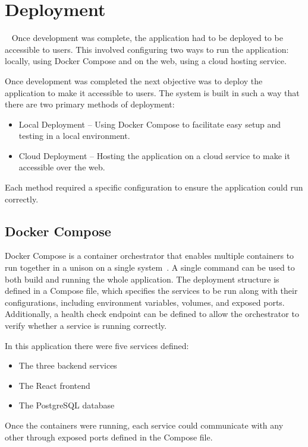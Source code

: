 \chapter{Deployment}~\label{cha:deployment}
Once development was complete, the application had to be deployed to be accessible to users. This involved configuring two ways to run the application: locally, using Docker Compose and on the web, using a cloud hosting service.

Once development was completed the next objective was to deploy the application to make it accessible to users. The system is built in such a way that there are two primary methods of deployment:

\begin{itemize}
    \item Local Deployment – Using Docker Compose to facilitate easy setup and testing in a local environment.
    \item Cloud Deployment – Hosting the application on a cloud service to make it accessible over the web.
\end{itemize}

Each method required a specific configuration to ensure the application could run correctly.

\section{Docker Compose}
Docker Compose is a container orchestrator that enables multiple containers to run together in a unison on a single system~\cite{DockerCompose}. A single command can be used to both build and running the whole application. The deployment structure is defined in a Compose file, which specifies the services to be run along with their configurations, including environment variables, volumes, and exposed ports. Additionally, a health check endpoint can be defined to allow the orchestrator to verify whether a service is running correctly.

In this application there were five services defined:
\begin{itemize}
    \item The three backend services
    \item The React frontend
    \item The PostgreSQL database
\end{itemize}

Once the containers were running, each service could communicate with any other through exposed ports defined in the Compose file.

